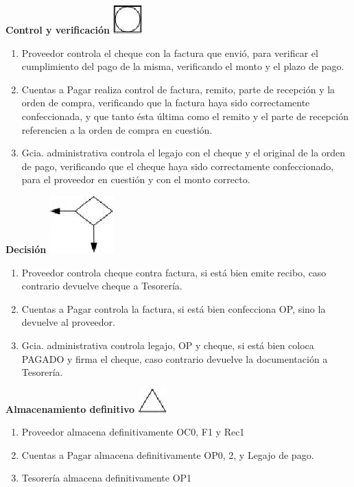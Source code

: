 \begin{center}
  \textbf{Control y verificación}
  \includegraphics{./Images/Simbolos/simbolo-Control-y-Verificacion.png}
\end{center}
\begin{enumerate}
  \item Proveedor controla el cheque con la factura que envió, para verificar el cumplimiento del pago de la misma, verificando el monto y el plazo de pago.
  \item Cuentas a Pagar realiza control de factura, remito, parte de recepción y la orden de compra, verificando que la factura haya sido correctamente confeccionada, y que tanto ésta última como el remito y el parte de recepción referencien a la orden de compra en cuestión. 
  \item Gcia. administrativa controla el legajo con el cheque y el original de la orden de pago, verificando que el cheque haya sido correctamente confeccionado, para el proveedor en cuestión y con el monto correcto.
\end{enumerate}

\begin{center}
  \textbf{Decisión}
  \includegraphics{./Images/Simbolos/simbolo-Decision.png}
\end{center}
\begin{enumerate}
  \item Proveedor controla cheque contra factura, si está bien emite recibo, caso contrario devuelve cheque a Tesorería.
  \item Cuentas a Pagar controla la factura, si está bien confecciona OP, sino la devuelve al proveedor.
  \item Gcia. administrativa controla legajo, OP y cheque, si está bien coloca PAGADO y firma el cheque, caso contrario devuelve la documentación a Tesorería.
\end{enumerate}

\begin{center}
  \textbf{Almacenamiento definitivo}
  \includegraphics{./Images/Simbolos/simbolo-Almacenamiento-Definitivo.png}
\end{center}
\begin{enumerate}
  \item Proveedor almacena definitivamente OC0, F1 y Rec1
  \item Cuentas a Pagar almacena definitivamente OP0, 2, y Legajo de pago.
  \item Tesorería almacena definitivamente OP1
\end{enumerate}

